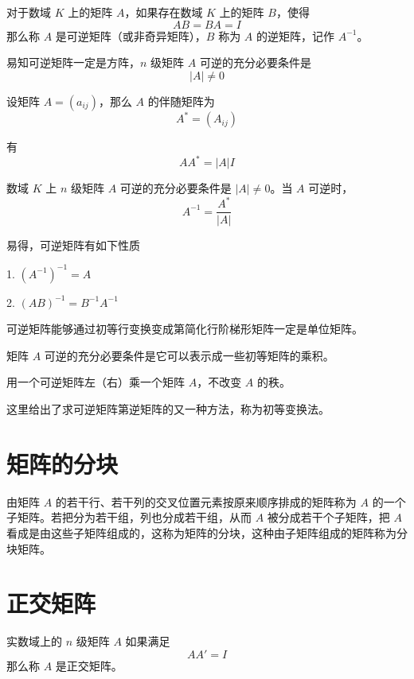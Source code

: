 \begin{definition}
    对于数域 $K$ 上的矩阵 $A$，如果存在数域 $K$ 上的矩阵 $B$，使得
    $$AB = BA = I$$
    那么称 $A$ 是可逆矩阵（或非奇异矩阵），$B$ 称为 $A$ 的逆矩阵，记作 $A^{-1}$。
\end{definition}

易知可逆矩阵一定是方阵，$n$ 级矩阵 $A$ 可逆的充分必要条件是
$$|A| \ne 0$$

\begin{definition}
    设矩阵 $A = (a_{ij})$，那么 $A$ 的伴随矩阵为
    $$A^*=(A_{ij})$$
\end{definition}

有
$$AA^* = |A|I$$

\begin{theorem}
    数域 $K$ 上 $n$ 级矩阵 $A$ 可逆的充分必要条件是 $|A| \ne 0$。当 $A$ 可逆时，
    $$A^{-1} = \frac{A^*}{|A|}$$
\end{theorem}

易得，可逆矩阵有如下性质

1. $(A^{-1})^{-1} = A$

2. $(AB)^{-1} = B^{-1}A^{-1}$

可逆矩阵能够通过初等行变换变成第简化行阶梯形矩阵一定是单位矩阵。

\begin{theorem}
    矩阵 $A$ 可逆的充分必要条件是它可以表示成一些初等矩阵的乘积。
\end{theorem}

用一个可逆矩阵左（右）乘一个矩阵 $A$，不改变 $A$ 的秩。

这里给出了求可逆矩阵第逆矩阵的又一种方法，称为初等变换法。

\section{矩阵的分块}

由矩阵 $A$ 的若干行、若干列的交叉位置元素按原来顺序排成的矩阵称为 $A$ 的一个子矩阵。若把分为若干组，列也分成若干组，从而 $A$ 被分成若干个子矩阵，把 $A$ 看成是由这些子矩阵组成的，这称为矩阵的分块，这种由子矩阵组成的矩阵称为分块矩阵。

\section{正交矩阵}

\begin{definition}
    实数域上的 $n$ 级矩阵 $A$ 如果满足
    $$AA'=I$$
    那么称 $A$ 是正交矩阵。
\end{definition}

